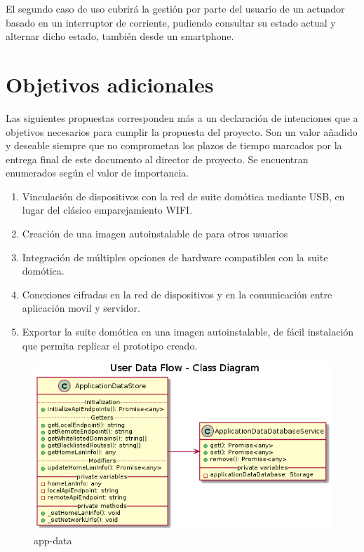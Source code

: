 El segundo caso de uso cubrirá la gestión por parte del usuario de un actuador basado en un interruptor de corriente, pudiendo consultar su estado actual y alternar dicho estado, también desde un smartphone.

\section{Objetivos adicionales}
\label{ch:Capitulo3.6}

Las siguientes propuestas corresponden más a un declaración de intenciones que a objetivos necesarios para cumplir la propuesta del proyecto. Son un valor añadido y deseable siempre que no comprometan los plazos de tiempo marcados por la entrega final de este documento al director de proyecto. Se encuentran enumerados según el valor de importancia.

\begin{enumerate}

  \item Vinculación de dispositivos con la red de suite domótica mediante USB, en lugar del clásico emparejamiento WIFI.

  \item Creación de una imagen autoinstalable de para otros usuarios

  \item Integración de múltiples opciones de hardware compatibles con la suite domótica.

  \item Conexiones cifradas en la red de dispositivos y en la comunicación entre aplicación movil y servidor.

  \item Exportar la suite domótica en una imagen autoinstalable, de fácil instalación que permita replicar el prototipo creado.

\end{enumerate}


\begin{figure}[hbt!]
\centering
\includegraphics[height=2.5in]{figures/diagrams/front/data-flow/app-data.png}
\caption[app-data]{app-data\footnotemark}
\end{figure}

